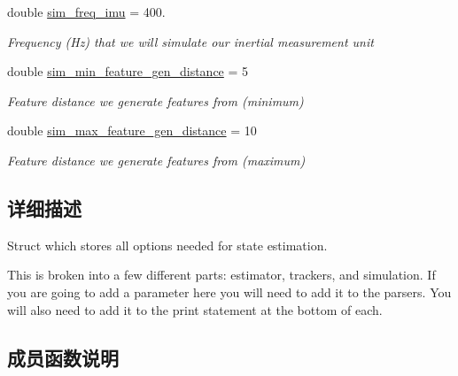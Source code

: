 \begin{DoxyCompactItemize}
\mbox{\label{structov__msckf_1_1VioManagerOptions_aaf63d79014853441849b5e6a2813020f}} 
double \hyperlink{structov__msckf_1_1VioManagerOptions_aaf63d79014853441849b5e6a2813020f}{sim\+\_\+freq\+\_\+imu} = 400.
\begin{DoxyCompactList}\small\item\em Frequency (Hz) that we will simulate our inertial measurement unit \end{DoxyCompactList}\item 
\mbox{\label{structov__msckf_1_1VioManagerOptions_ae229dda22c11905a023f944f2b25842a}} 
double \hyperlink{structov__msckf_1_1VioManagerOptions_ae229dda22c11905a023f944f2b25842a}{sim\+\_\+min\+\_\+feature\+\_\+gen\+\_\+distance} = 5
\begin{DoxyCompactList}\small\item\em Feature distance we generate features from (minimum) \end{DoxyCompactList}\item 
\mbox{\label{structov__msckf_1_1VioManagerOptions_a2663dc7c331d58f45e1ce701211f68dc}} 
double \hyperlink{structov__msckf_1_1VioManagerOptions_a2663dc7c331d58f45e1ce701211f68dc}{sim\+\_\+max\+\_\+feature\+\_\+gen\+\_\+distance} = 10
\begin{DoxyCompactList}\small\item\em Feature distance we generate features from (maximum) \end{DoxyCompactList}\end{DoxyCompactItemize}


\subsection{详细描述}
Struct which stores all options needed for state estimation. 

This is broken into a few different parts\+: estimator, trackers, and simulation. If you are going to add a parameter here you will need to add it to the parsers. You will also need to add it to the print statement at the bottom of each. 

\subsection{成员函数说明}
\mbox{\label{structov__msckf_1_1VioManagerOptions_a47c23046d8d14887345655c41086a6be}} 
